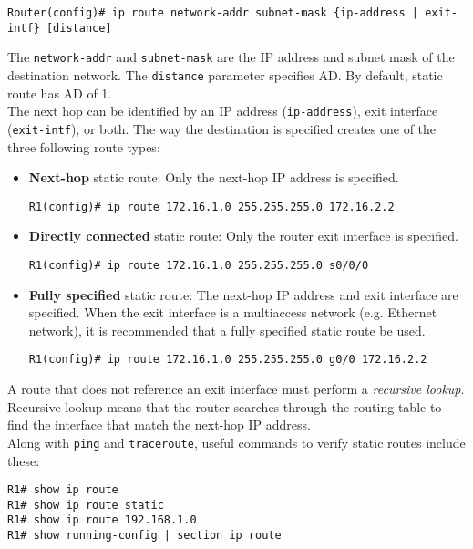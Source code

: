 \begin{verbatim}
Router(config)# ip route network-addr subnet-mask {ip-address | exit-intf} [distance]
\end{verbatim}

The \verb|network-addr| and \verb|subnet-mask| are the IP address and subnet mask of the destination network. The \verb|distance| parameter specifies AD. By default, static route has AD of 1.\\

The next hop can be identified by an IP address (\verb|ip-address|), exit interface (\verb|exit-intf|), or both. The way the destination is specified creates one of the three following route types:

\begin{itemize}
\item \textbf{Next-hop} static route: Only the next-hop IP address is specified.

\begin{verbatim}
R1(config)# ip route 172.16.1.0 255.255.255.0 172.16.2.2
\end{verbatim}

\item \textbf{Directly connected} static route: Only the router exit interface is specified.

\begin{verbatim}
R1(config)# ip route 172.16.1.0 255.255.255.0 s0/0/0
\end{verbatim}

\item \textbf{Fully specified} static route: The next-hop IP address and exit interface are specified. When the exit interface is a multiaccess network (e.g. Ethernet network), it is recommended that a fully specified static route be used. 

\begin{verbatim}
R1(config)# ip route 172.16.1.0 255.255.255.0 g0/0 172.16.2.2
\end{verbatim}
\end{itemize}

A route that does not reference an exit interface must perform a \emph{recursive lookup}. Recursive lookup means that the router searches through the routing table to find the interface that match the next-hop IP address.\\ 

Along with \verb|ping| and \verb|traceroute|, useful commands to verify static routes include these:
\begin{verbatim}
R1# show ip route
R1# show ip route static
R1# show ip route 192.168.1.0
R1# show running-config | section ip route
\end{verbatim}


